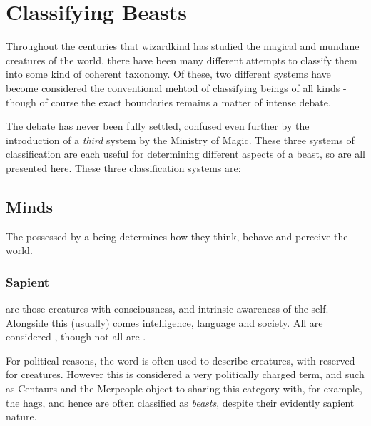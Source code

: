 \newcommand\type[2]
{
	\key{#1:} #2
}
\newcommand\squote[1]
{
``#1"
}

\chapter{Classifying Beasts}

Throughout the centuries that wizardkind has studied the magical and mundane creatures of the world, there have been many different attempts to classify them into some kind of coherent taxonomy. Of these, two different systems have become considered the conventional mehtod of classifying beings of all kinds - though of course the exact boundaries remains a matter of intense debate. 

The debate has never been fully settled, confused even further by the introduction of a {\it third} system by the Ministry of Magic. These three systems of classification are each useful for determining different aspects of a beast, so are all presented here. These three classification systems are:

\begin{itemize}
\end{itemize}

\section{Minds}

The  possessed by a being determines how they think, behave and perceive the world.

\subsection{Sapient}

 are those creatures with consciousness, and intrinsic awareness of the self. Alongside this (usually) comes intelligence, language and society. All  are considered , though not all  are .  

For political reasons, the word  is often used to describe  creatures, with  reserved for  creatures. However this is considered a very politically charged term, and  such as Centaurs and the Merpeople object to sharing this category with, for example, the hags, and hence are often classified as {\it beasts}, despite their evidently sapient nature. 


